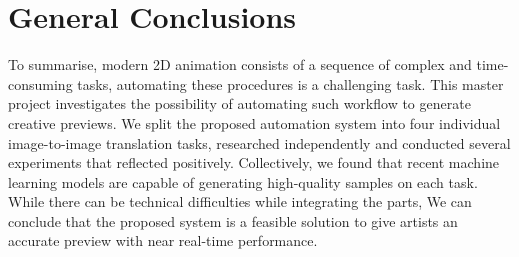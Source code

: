 \chapter{General Conclusions}
\label{chapterlabel8}

To summarise, modern 2D animation consists of a sequence of complex and time-consuming tasks, automating these procedures is a challenging task. This master project investigates the possibility of automating such workflow to generate creative previews. We split the proposed automation system into four individual image-to-image translation tasks, researched independently and conducted several experiments that reflected positively. Collectively, we found that recent machine learning models are capable of generating high-quality samples on each task. While there can be technical difficulties while integrating the parts, We can conclude that the proposed system is a feasible solution to give artists an accurate preview with near real-time performance.

